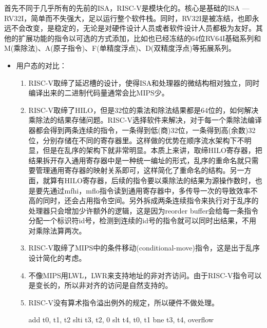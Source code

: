 首先不同于几乎所有的先前的ISA，RISC-V是模块化的。核心是基础的ISA --- RV32I，简单而不失强大，足以运行整个软件栈。同时，RV32I是被冻结，也即永远不会改变，是稳定的，无论是对硬件设计人员或者软件设计人员都极为友好。其他的扩展功能的指令以可选的方式添加，比如也已经冻结的64位RV64I基础系列和M(乘除法)、A(原子指令)、F(单精度浮点)、D(双精度浮点)等拓展系列\citep{Patterson:2017:RRO:3202479}。
\begin{itemize}
	\item 用户态的对比：
	\begin{enumerate}[label=(\alph*)]
		\item RISC-V取缔了延迟槽的设计，使得ISA和处理器的微结构相对独立，同时编译出来的二进制代码量通常会比MIPS少。
		\item RISC-V取缔了HILO，但是32位的乘法和除法结果都是64位的，如何解决乘除法的结果存储问题。RISC-V选择软件来解决，对于每一个乘除法编译器都会得到两条连续的指令，一条得到低(商)32位，一条得到高(余数)32位，分别存储在不同的寄存器里。这样做的优势在顺序流水架构下不明显，但是在乱序的架构下就非常明显。本质上来讲，取缔HILO寄存器，把结果拆开存入通用寄存器中是一种统一编址的形式，乱序的重命名就只需要管理通用寄存器的映射关系即可，这样简化了重命名的结构。另一方面，就算有HILO寄存器，后续的指令要以乘除法的结果为源操作数时，也是要先通过mfhi，mflo指令读到通用寄存器中，多传导一次的导致效率不高的同时，还会占用指令空间。另外拆成两条连续指令来执行对于乱序的处理器只会增加少许额外的逻辑，这是因为reorder buffer会给每一条指令分配一个标识符id号，检测到连续的id号的指令就可以同时出结果，不用对乘除法算两次。
		\item RISC-V取缔了MIPS中的条件移动(conditional-move)指令，这是出于乱序设计简化的考虑。
		\item 不像MIPS用LWL，LWR来支持地址的非对齐访问。由于RISC-V指令可以是变长的，所以非对齐的访问是自然支持的。
		\item RISC-V没有算术指令溢出例外的规定，所以硬件不做处理。
		\begin{scala}
			add t0, t1, t2
			slti t3, t2, 0
			slt t4, t0, t1
			bne t3, t4, overflow
		\end{scala}
	

\end{enumerate}
\end{itemize}
